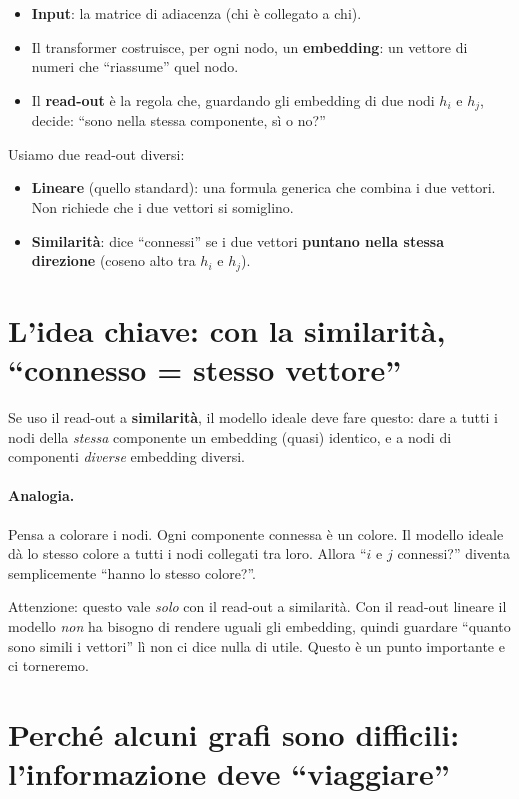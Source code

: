 \documentclass[11pt,a4paper]{article}
\begin{document}
\begin{itemize}
  \item \textbf{Input}: la matrice di adiacenza (chi è collegato a chi).
  \item Il transformer costruisce, per ogni nodo, un \textbf{embedding}: un
        vettore di numeri che ``riassume'' quel nodo.
  \item Il \textbf{read-out} è la regola che, guardando gli embedding di due
        nodi $h_i$ e $h_j$, decide: ``sono nella stessa componente, sì o no?''
\end{itemize}

Usiamo due read-out diversi:
\begin{itemize}
  \item \textbf{Lineare} (quello standard): una formula generica che combina i
        due vettori. Non richiede che i due vettori si somiglino.
  \item \textbf{Similarità}: dice ``connessi'' se i due vettori
        \textbf{puntano nella stessa direzione} (coseno alto tra $h_i$ e $h_j$).
\end{itemize}

\section{L'idea chiave: con la similarità, ``connesso = stesso vettore''}

Se uso il read-out a \textbf{similarità}, il modello ideale deve fare questo:
dare a tutti i nodi della \emph{stessa} componente un embedding (quasi)
identico, e a nodi di componenti \emph{diverse} embedding diversi.

\paragraph{Analogia.} Pensa a colorare i nodi. Ogni componente connessa è un
colore. Il modello ideale dà lo stesso colore a tutti i nodi collegati tra loro.
Allora ``$i$ e $j$ connessi?'' diventa semplicemente ``hanno lo stesso colore?''.

Attenzione: questo vale \emph{solo} con il read-out a similarità. Con il read-out
lineare il modello \emph{non} ha bisogno di rendere uguali gli embedding, quindi
guardare ``quanto sono simili i vettori'' lì non ci dice nulla di utile. Questo
è un punto importante e ci torneremo.

\section{Perché alcuni grafi sono difficili: l'informazione deve ``viaggiare''}
\end{document}
